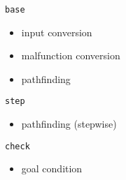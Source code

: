 \begin{frame}
    \begin{minipage}{0.5\textwidth}
        \texttt{base}
        \begin{itemize}
            \item input conversion
            \item malfunction conversion
            \item pathfinding
        \end{itemize}
    \end{minipage}%
    \begin{minipage}{0.5\textwidth}
        \begin{minipage}{\textwidth}
            \texttt{step}
            \begin{itemize}
                \item pathfinding (stepwise)
            \end{itemize}
        \end{minipage}
        \begin{minipage}{\textwidth}
            \texttt{check}
            \begin{itemize}
                \item goal condition
            \end{itemize}
        \end{minipage}
    \end{minipage}
\end{frame}